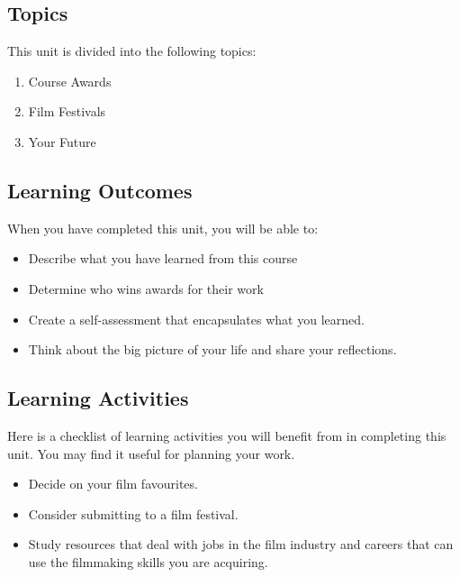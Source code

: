 \documentclass[
  letterpaper,
  DIV=11,
  numbers=noendperiod]{scrreprt}
\providecommand{\tightlist}{%
  \setlength{\itemsep}{0pt}\setlength{\parskip}{0pt}}\usepackage{longtable,booktabs,array}
\begin{document}
\subsection*{Topics}\label{topics-9}

This unit is divided into the following topics:

\begin{enumerate}
\def\labelenumi{\arabic{enumi}.}
\tightlist
\item
  Course Awards
\item
  Film Festivals
\item
  Your Future
\end{enumerate}

\subsection*{Learning Outcomes}\label{learning-outcomes-9}

When you have completed this unit, you will be able to:

\begin{itemize}
\tightlist
\item
  Describe what you have learned from this course
\item
  Determine who wins awards for their work
\item
  Create a self-assessment that encapsulates what you learned.
\item
  Think about the big picture of your life and share your reflections.
\end{itemize}

\subsection*{Learning Activities}\label{learning-activities-9}

Here is a checklist of learning activities you will benefit from in
completing this unit. You may find it useful for planning your work.

\begin{itemize}
\tightlist
\item
  Decide on your film favourites.
\item
  Consider submitting to a film festival.
\item
  Study resources that deal with jobs in the film industry and careers
  that can use the filmmaking skills you are acquiring.
\end{itemize}
\end{document}
